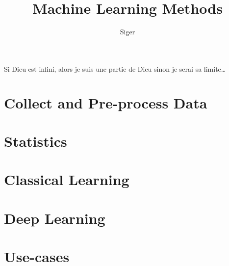 \documentclass[a4paper, 10pt]{report}
\title{Machine Learning Methods}
\author{Siger}
\begin{document}
\maketitle

Si Dieu est infini, alors je suis une partie de Dieu sinon je serai sa limite\ldots


\tableofcontents

\part{Collect and Pre-process Data}

\part{Statistics}

\part{Classical Learning}

\part{Deep Learning}
\part{Use-cases}

\printbibliography
\end{document}
